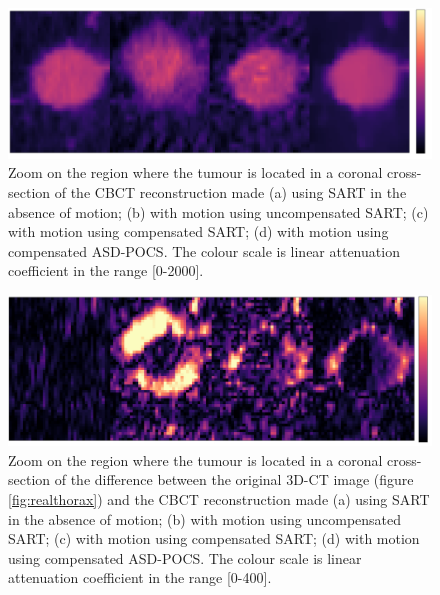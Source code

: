 \begin{figure}[H]
\begin{center} 
\includegraphics[width=1\linewidth]{MotionCorrection/tumourCC2.png}
\hspace{0.1cm}{\footnotesize (a)}\hspace{3.2cm}{\footnotesize (b)}\hspace{3.2cm}{\footnotesize (c)}\hspace{3.2cm}{\footnotesize (d)} 
\caption{\label{fig:tumourCC}  Zoom on the region where the tumour is located in a coronal cross-section of the CBCT reconstruction made (a) using SART in the absence of motion; (b) with motion using uncompensated SART; (c) with motion using compensated SART; (d) with motion using compensated ASD-POCS. The colour scale is linear attenuation coefficient in the range [0-2000].} 
\end{center} 
\end{figure}

\begin{figure}[H]
\begin{center} 
\includegraphics[width=1\linewidth]{MotionCorrection/tumourCC_err2.png}
\hspace{0.1cm}{\footnotesize (a)}\hspace{3.2cm}{\footnotesize (b)}\hspace{3.2cm}{\footnotesize (c)}\hspace{3.2cm}{\footnotesize (d)} 
\caption{\label{fig:tumourCC_err}  Zoom on the region where the tumour is located in a coronal cross-section of the difference  between the original 3D-CT image (figure \ref{fig:realthorax}) and the CBCT reconstruction made (a) using SART in the absence of motion; (b) with motion using uncompensated SART; (c) with motion using compensated SART; (d) with motion using compensated ASD-POCS. The colour scale is linear attenuation coefficient in the range [0-400].} 
\end{center} 
\end{figure}


